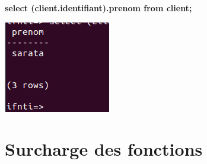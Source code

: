 \documentclass[12pt,b5paper]{article}
\begin{document}
\textbf{select (client.identifiant).prenom from client;}
\begin{center}
\includegraphics[scale=0.5]{pre}\\
\end{center}

\section{ Surcharge des fonctions}
\end{document}
